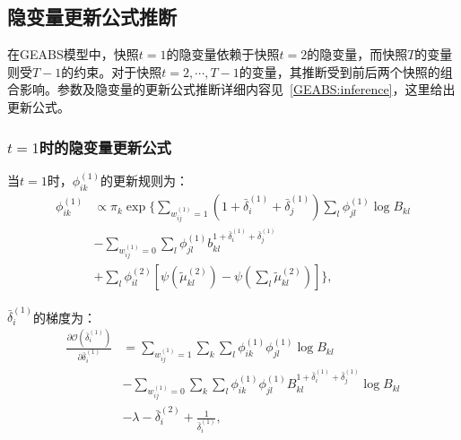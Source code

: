 \subsection{隐变量更新公式推断}

在GEABS模型中，快照$t=1$的隐变量依赖于快照$t=2$的隐变量，而快照$T$的变量则受$T-1$的约束。对于快照$t=2, \cdots, T-1$的变量，其推断受到前后两个快照的组合影响。参数及隐变量的更新公式推断详细内容见~\ref{GEABS:inference}，这里给出更新公式。
\subsubsection{$t=1$时的隐变量更新公式}
当$t=1$时，$\phi_{ik}^{(1)}$的更新规则为：
\begin{equation}
\begin{split}
\phi _{ik}^{(1)} & \propto \pi_k \exp\{ \sum_{w_{ij}^{(1)}=1} (1+\bar{\delta}_i^{(1)}+\bar{\delta}_j^{(1)}) \sum_l \phi_{jl}^{(1)} \log B_{kl} \\
& -\sum_{w_{ij}^{(1)}=0} \sum_l \phi_{jl}^{(1)}  b_{kl}^{1+\bar{\delta}_i^{(1)}+\bar{\delta}_j^{(1)}} \\
& + \sum_l \phi_{il}^{(2)}[\psi(\tilde{\mu}_{kl}^{(2)}) - \psi(\sum_l \tilde{\mu}_{kl}^{(2)})] \},
\end{split}
\end{equation}

$\bar{\delta}_i^{(1)}$的梯度为：
\begin{equation}
\begin{split}
\frac{\partial \mathscr{O}(\bar{\delta}_i^{(1)})}{\partial \bar{\delta}_i^{(1)}} & =\sum_{w_{ij}^{(1)}=1} \sum_k \sum_l \phi_{ik}^{(1)}\phi_{jl}^{(1)} \log B_{kl} \\
& -\sum_{w_{ij}^{(1)}=0} \sum_k \sum_l \phi_{ik}^{(1)}\phi_{jl}^{(1)}  B_{kl}^{1+\bar{\delta}_i^{(1)}+\bar{\delta}_j^{(1)}} \log B_{kl} \\
& -\lambda - \bar{\delta}_i^{(2)} + \frac{1}{\bar{\delta}_i^{(1)}},
\end{split}
\label{eq:delta1}
\end{equation}

